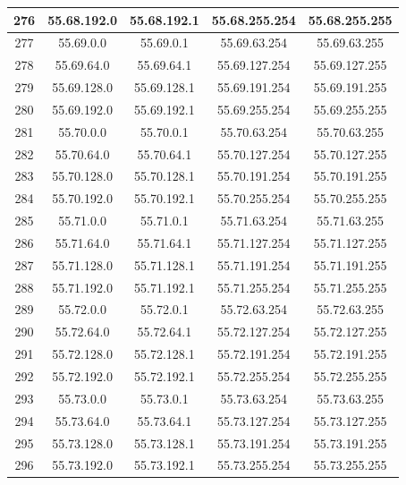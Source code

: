 \documentclass[letterpaper,12pt]{article}
\begin{document}
\begin{center}
\begin{longtable}{|c|c|c|c|c|}
                276 & 55.68.192.0 & 55.68.192.1 & 55.68.255.254 & 55.68.255.255 \\ \hline
                277 & 55.69.0.0 & 55.69.0.1 & 55.69.63.254 & 55.69.63.255 \\ \hline
                278 & 55.69.64.0 & 55.69.64.1 & 55.69.127.254 & 55.69.127.255 \\ \hline
                279 & 55.69.128.0 & 55.69.128.1 & 55.69.191.254 & 55.69.191.255 \\ \hline
                280 & 55.69.192.0 & 55.69.192.1 & 55.69.255.254 & 55.69.255.255 \\ \hline
                281 & 55.70.0.0 & 55.70.0.1 & 55.70.63.254 & 55.70.63.255 \\ \hline
                282 & 55.70.64.0 & 55.70.64.1 & 55.70.127.254 & 55.70.127.255 \\ \hline
                283 & 55.70.128.0 & 55.70.128.1 & 55.70.191.254 & 55.70.191.255 \\ \hline
                284 & 55.70.192.0 & 55.70.192.1 & 55.70.255.254 & 55.70.255.255 \\ \hline
                285 & 55.71.0.0 & 55.71.0.1 & 55.71.63.254 & 55.71.63.255 \\ \hline
                286 & 55.71.64.0 & 55.71.64.1 & 55.71.127.254 & 55.71.127.255 \\ \hline
                287 & 55.71.128.0 & 55.71.128.1 & 55.71.191.254 & 55.71.191.255 \\ \hline
                288 & 55.71.192.0 & 55.71.192.1 & 55.71.255.254 & 55.71.255.255 \\ \hline
                289 & 55.72.0.0 & 55.72.0.1 & 55.72.63.254 & 55.72.63.255 \\ \hline
                290 & 55.72.64.0 & 55.72.64.1 & 55.72.127.254 & 55.72.127.255 \\ \hline
                291 & 55.72.128.0 & 55.72.128.1 & 55.72.191.254 & 55.72.191.255 \\ \hline
                292 & 55.72.192.0 & 55.72.192.1 & 55.72.255.254 & 55.72.255.255 \\ \hline
                293 & 55.73.0.0 & 55.73.0.1 & 55.73.63.254 & 55.73.63.255 \\ \hline
                294 & 55.73.64.0 & 55.73.64.1 & 55.73.127.254 & 55.73.127.255 \\ \hline
                295 & 55.73.128.0 & 55.73.128.1 & 55.73.191.254 & 55.73.191.255 \\ \hline
                296 & 55.73.192.0 & 55.73.192.1 & 55.73.255.254 & 55.73.255.255 \\ \hline

\end{longtable}
\end{center}
\end{document}
